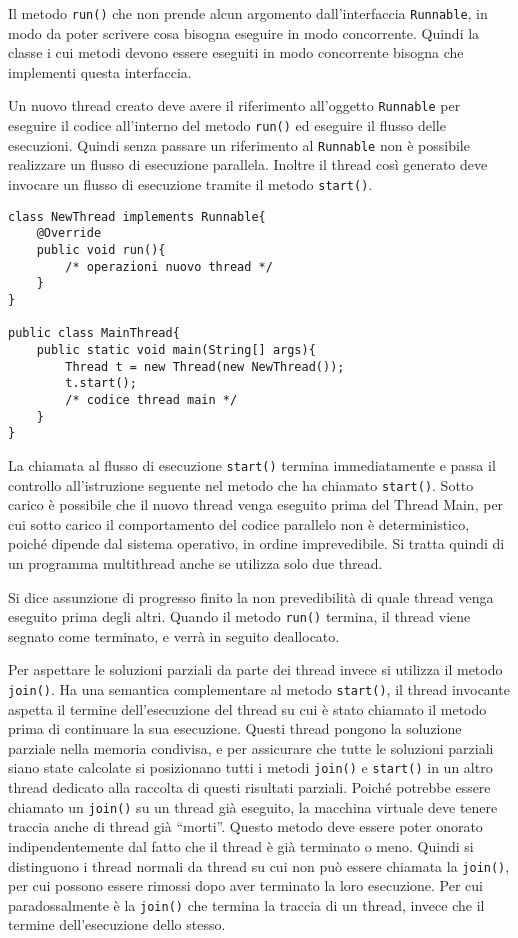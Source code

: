 \documentclass{article}
\numberwithin{equation}{subsection}
\begin{document}
Il metodo \verb|run()| che non prende alcun argomento dall'interfaccia \verb|Runnable|, in modo da poter scrivere cosa bisogna eseguire in modo concorrente. Quindi la classe 
i cui metodi devono essere eseguiti in modo concorrente bisogna che implementi questa interfaccia. 

Un nuovo thread creato deve avere il riferimento all'oggetto \verb|Runnable| per eseguire il codice all'interno del metodo \verb|run()| ed eseguire il flusso delle 
esecuzioni. 
Quindi senza passare un riferimento al \verb|Runnable| non è possibile realizzare un flusso di esecuzione parallela. Inoltre il thread così generato deve invocare un 
flusso di esecuzione tramite il metodo \verb|start()|. 
\begin{verbatim}
class NewThread implements Runnable{
    @Override 
    public void run(){
        /* operazioni nuovo thread */
    }
}

public class MainThread{
    public static void main(String[] args){
        Thread t = new Thread(new NewThread());
        t.start();
        /* codice thread main */
    }
}
\end{verbatim}

La chiamata al flusso di esecuzione \verb|start()| termina immediatamente e passa il controllo all'istruzione seguente nel metodo che ha chiamato \verb|start()|. 
Sotto carico è possibile che il nuovo thread venga eseguito prima del Thread Main, per cui sotto carico il comportamento del codice parallelo non è deterministico, poiché 
dipende dal sistema operativo, in ordine imprevedibile. 
Si tratta quindi di un programma multithread anche se utilizza solo due thread. 

Si dice assunzione di progresso finito la non prevedibilità di quale thread venga eseguito prima degli altri. Quando il metodo \verb|run()| termina, il thread viene segnato 
come terminato, e verrà in seguito deallocato. 


Per aspettare le soluzioni parziali da parte dei thread invece si utilizza il metodo \verb|join()|. Ha una semantica complementare al metodo \verb|start()|, il thread 
invocante aspetta il termine dell'esecuzione del thread su cui è stato chiamato il metodo prima di continuare la sua esecuzione. 
Questi thread pongono la soluzione parziale nella memoria condivisa, e per assicurare che tutte le soluzioni parziali siano state calcolate si posizionano tutti i metodi 
\verb|join()| e \verb|start()| in un altro thread dedicato alla raccolta di questi risultati parziali. 
Poiché potrebbe essere chiamato un \verb|join()| su un thread già eseguito, la macchina virtuale deve tenere traccia anche di thread già ``morti''. Questo metodo deve 
essere poter onorato indipendentemente dal fatto che il thread è già terminato o meno. Quindi si distinguono i thread normali da thread su cui non può essere chiamata la \verb|join()|, 
per cui possono essere rimossi dopo aver terminato la loro esecuzione. 
Per cui paradossalmente è la \verb|join()| che termina la traccia di un thread, invece che il termine dell'esecuzione dello stesso. 
\end{document}
